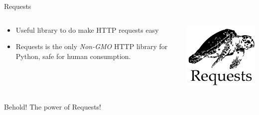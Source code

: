 \documentclass{lug}
\begin{document}
\begin{frame}{Requests}
    \begin{columns}
        \begin{column}{0.7\linewidth}
            \begin{itemize}[<+->]
                \item Useful library to do make HTTP requests easy
                \item Requests is the only \emph{Non-GMO} HTTP library for
                    Python, safe for human consumption.
            \end{itemize}
        \end{column}
        \begin{column}{0.3\linewidth}
            \includegraphics[width=\linewidth]{graphics/requests}
        \end{column}
    \end{columns}

    \pause[\thebeamerpauses]
    \bigskip

    \begin{block}{Behold! The power of Requests!}
        \begin{minipage}{\linewidth}
            \tiny
            \inputminted{pycon}{console/requests_ex.py}
        \end{minipage}
    \end{block}
\end{frame}
\end{document}
